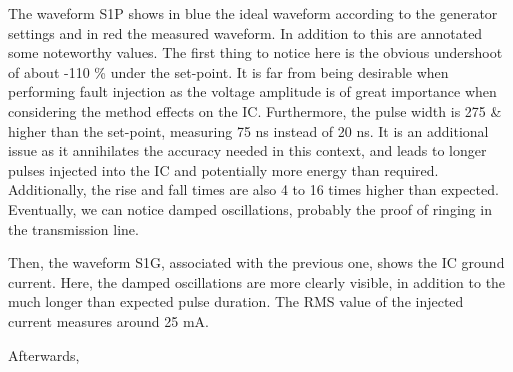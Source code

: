 		The waveform S1P shows in blue the ideal waveform according to the generator settings and in red the measured waveform.
		In addition to this are annotated some noteworthy values.
		The first thing to notice here is the obvious undershoot of about -110 \% under the set-point.
		It is far from being desirable when performing fault injection as the voltage amplitude is of great importance when considering the method effects on the IC.
		Furthermore, the pulse width is 275 \& higher than the set-point, measuring 75 ns instead of 20 ns.
		It is an additional issue as it annihilates the accuracy needed in this context, and leads to longer pulses injected into the IC and potentially more energy than required.
		Additionally, the rise and fall times are also 4 to 16 times higher than expected.
		Eventually, we can notice damped oscillations, probably the proof of ringing in the transmission line.
		
		Then, the waveform S1G, associated with the previous one, shows the IC ground current.
		Here, the damped oscillations are more clearly visible, in addition to the much longer than expected pulse duration.
		The RMS value of the injected current measures around 25 mA.
		
		Afterwards, 
	
